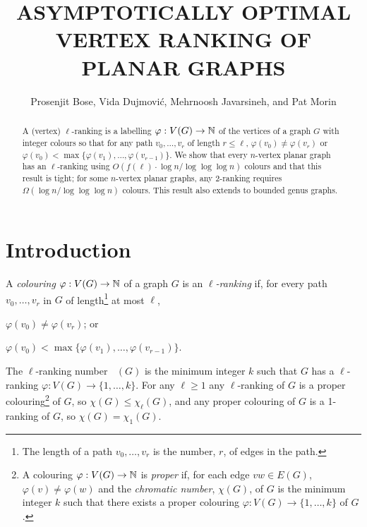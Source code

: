 \documentclass[kpfonts]{patmorin}
\title{\MakeUppercase{Asymptotically Optimal Vertex Ranking of Planar Graphs}}
\author{Prosenjit Bose, Vida Dujmović, Mehrnoosh Javarsineh, and Pat Morin}
\DeclareMathOperator{\lrn}{\chi_{\ell}}
\theoremstyle{named}
\begin{document}
\begin{titlepage}
\maketitle

\begin{abstract}
  A (vertex) $\ell$-ranking is a labelling $\varphi:V(G)\to\mathbb{N}$ of the vertices of a graph $G$ with integer colours so that for any path $v_0,\ldots,v_r$ of length $r\le \ell$, $\varphi(v_0)\neq\varphi(v_r)$ or $\varphi(v_0)<\max\{\varphi(v_1),\ldots,\varphi(v_{r-1})\}$.  We show that every $n$-vertex planar graph has an $\ell$-ranking using $O(f(\ell)\cdot\log n/\log\log\log n)$ colours and that this result is tight; for some $n$-vertex planar graphs, any 2-ranking requires $\Omega(\log n/\log\log\log n)$ colours.  This result also extends to bounded genus graphs.

\end{abstract}
\end{titlepage}

\tableofcontents

\newpage
{}

\section{Introduction}

A \emph{colouring} $\varphi:V(G)\to \mathbb{N}$ of a graph $G$ is an \emph{$\ell$-ranking} if, for every path $v_0,\ldots,v_r$ in $G$ of length\footnote{The length of a path $v_0,\ldots,v_r$ is the number, $r$, of edges in the path.} at most $\ell$,
\begin{inparaenum}[(i)]
    \item $\varphi(v_0)\neq\varphi(v_r)$; or \item $\varphi(v_0)<\max\{\varphi(v_1),\ldots,\varphi(v_{r-1})\}$.
\end{inparaenum}
The $\ell$-ranking number $\lrn(G)$ is the minimum integer $k$ such that $G$ has a $\ell$-ranking $\varphi:V(G)\to \{1,\ldots,k\}$.  For any $\ell\ge 1$ any $\ell$-ranking of $G$ is a proper colouring\footnote{A colouring $\varphi:V(G)\to \mathbb{N}$ is \emph{proper} if, for each edge $vw\in E(G)$, $\varphi(v)\neq\varphi(w)$ and the \emph{chromatic number}, $\chi(G)$, of $G$ is the minimum integer $k$ such that there exists a proper colouring $\varphi:V(G)\to\{1,\ldots,k\}$ of $G$.} of $G$, so $\chi(G)\le \chi_\ell(G)$, and any proper colouring of $G$ is a 1-ranking of $G$, so $\chi(G)=\chi_1(G)$.
\end{document}
